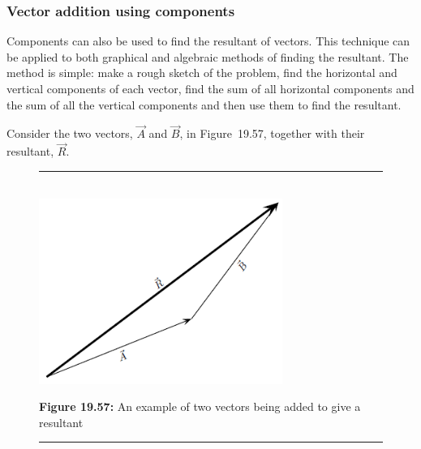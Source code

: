       \label{m38819*uid68}
            \subsubsection{ Vector addition using components}
            \nopagebreak
            
        
        \label{m38819*id193784}Components can also be used to find the resultant of vectors. This technique can be applied to both graphical and algebraic methods of finding the resultant. The method is simple: make a rough sketch of the problem, find the horizontal and vertical components of each vector, find the sum of all horizontal components and the sum of all the vertical components and then use them to find the resultant.\par 
        \label{m38819*id193790}Consider the two vectors, \begin{math}\stackrel{\to }{A}\end{math} and \begin{math}\stackrel{\to }{B}\end{math}, in Figure~19.57, together with their resultant, \begin{math}\stackrel{\to }{R}\end{math}.\par 
        
    \setcounter{subfigure}{0}


	\begin{figure}[H] %
    \begin{center}
    \rule[.1in]{\figurerulewidth}{.005in} \\
        \label{m38819*uid69!!!underscore!!!media}\label{m38819*uid69!!!underscore!!!printimage}\includegraphics[width=300px]{col11305.imgs/m38819_PG11C1_064.png} %
        
      \vspace{2pt}
    \vspace{\rubberspace}\par \begin{cnxcaption}
	  \small \textbf{Figure 19.57: }An example of two vectors being added to give a resultant
	\end{cnxcaption}
      
    \vspace{.1in}
    \rule[.1in]{\figurerulewidth}{.005in} \\
        
    \end{center}

 \end{figure}   

